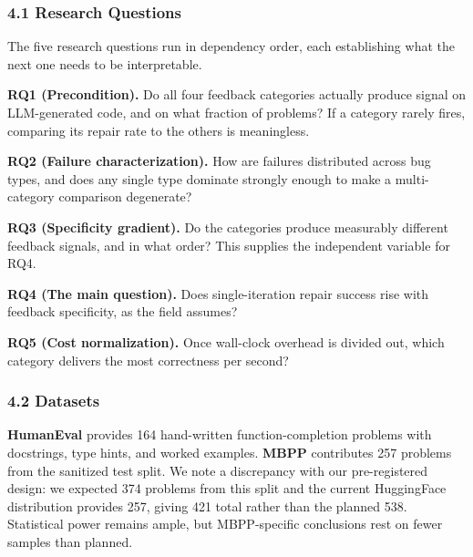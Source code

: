 
\subsubsection{4.1 Research Questions}

The five research questions run in dependency order, each establishing what the next one needs to be interpretable.

\textbf{RQ1 (Precondition).} Do all four feedback categories actually produce signal on LLM-generated code, and on what fraction of problems? If a category rarely fires, comparing its repair rate to the others is meaningless.

\textbf{RQ2 (Failure characterization).} How are failures distributed across bug types, and does any single type dominate strongly enough to make a multi-category comparison degenerate?

\textbf{RQ3 (Specificity gradient).} Do the categories produce measurably different feedback signals, and in what order? This supplies the independent variable for RQ4.

\textbf{RQ4 (The main question).} Does single-iteration repair success rise with feedback specificity, as the field assumes?

\textbf{RQ5 (Cost normalization).} Once wall-clock overhead is divided out, which category delivers the most correctness per second?

\subsubsection{4.2 Datasets}

\begin{table}[htbp]
\centering
{}
\end{table}

\textbf{HumanEval} \citep{Chen2021Evaluating} provides 164 hand-written function-completion problems with docstrings, type hints, and worked examples. \textbf{MBPP} \citep{Austin2021Program} contributes 257 problems from the sanitized test split. We note a discrepancy with our pre-registered design: we expected 374 problems from this split and the current HuggingFace distribution provides 257, giving 421 total rather than the planned 538. Statistical power remains ample, but MBPP-specific conclusions rest on fewer samples than planned.

